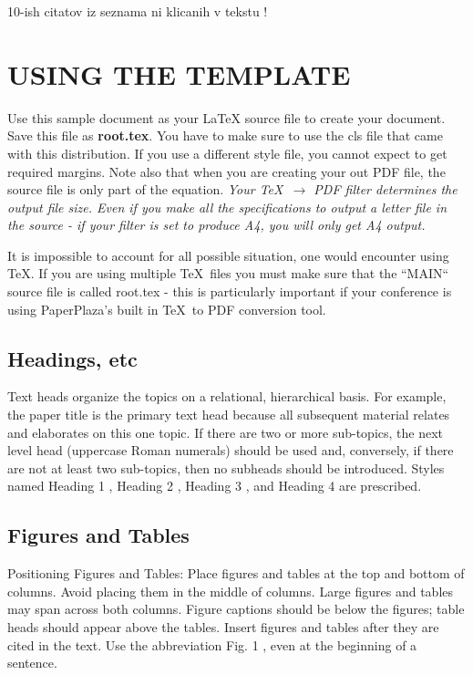 \documentclass[letterpaper, 10 pt, conference]{ieeeconf}  %
\begin{document}
 \alert{10-ish citatov iz seznama ni klicanih v tekstu !}

\clearpage

\section{USING THE TEMPLATE}

Use this sample document as your LaTeX source file to create your document. Save this file as {\bf root.tex}. You have to make sure to use the cls file that came with this distribution. If you use a different style file, you cannot expect to get required margins. Note also that when you are creating your out PDF file, the source file is only part of the equation. {\it Your \TeX\ $\rightarrow$ PDF filter determines the output file size. Even if you make all the specifications to output a letter file in the source - if your filter is set to produce A4, you will only get A4 output. }

It is impossible to account for all possible situation, one would encounter using \TeX. If you are using multiple \TeX\ files you must make sure that the ``MAIN`` source file is called root.tex - this is particularly important if your conference is using PaperPlaza's built in \TeX\ to PDF conversion tool.

\subsection{Headings, etc}

Text heads organize the topics on a relational, hierarchical basis. For example, the paper title is the primary text head because all subsequent material relates and elaborates on this one topic. If there are two or more sub-topics, the next level head (uppercase Roman numerals) should be used and, conversely, if there are not at least two sub-topics, then no subheads should be introduced. Styles named  Heading 1 ,  Heading 2 ,  Heading 3 , and  Heading 4  are prescribed.

\subsection{Figures and Tables}

Positioning Figures and Tables: Place figures and tables at the top and bottom of columns. Avoid placing them in the middle of columns. Large figures and tables may span across both columns. Figure captions should be below the figures; table heads should appear above the tables. Insert figures and tables after they are cited in the text. Use the abbreviation  Fig. 1 , even at the beginning of a sentence.
\end{document}
